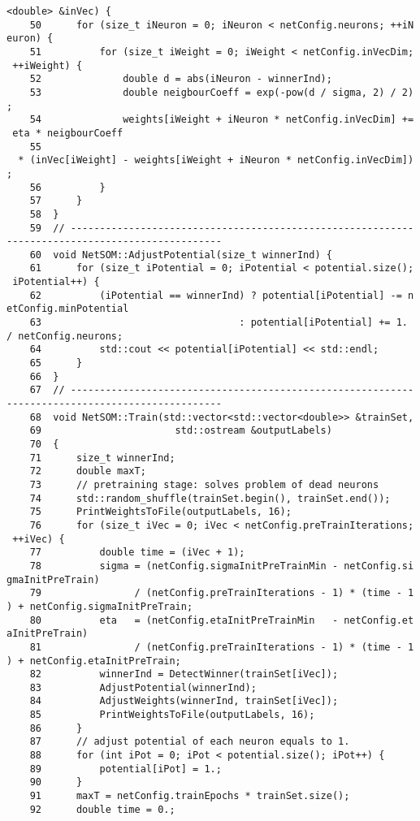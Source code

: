 \begin{verbatim}
<double> &inVec) {
    50      for (size_t iNeuron = 0; iNeuron < netConfig.neurons; ++iN
euron) {
    51          for (size_t iWeight = 0; iWeight < netConfig.inVecDim;
 ++iWeight) {
    52              double d = abs(iNeuron - winnerInd);
    53              double neigbourCoeff = exp(-pow(d / sigma, 2) / 2)
;
    54              weights[iWeight + iNeuron * netConfig.inVecDim] +=
 eta * neigbourCoeff 
    55                                                                
  * (inVec[iWeight] - weights[iWeight + iNeuron * netConfig.inVecDim])
;
    56          }
    57      }
    58  }
    59  // -----------------------------------------------------------
-------------------------------------
    60  void NetSOM::AdjustPotential(size_t winnerInd) {
    61      for (size_t iPotential = 0; iPotential < potential.size();
 iPotential++) {
    62          (iPotential == winnerInd) ? potential[iPotential] -= n
etConfig.minPotential
    63                                  : potential[iPotential] += 1. 
/ netConfig.neurons;
    64          std::cout << potential[iPotential] << std::endl;
    65      }
    66  }
    67  // -----------------------------------------------------------
-------------------------------------
    68  void NetSOM::Train(std::vector<std::vector<double>> &trainSet,
    69                       std::ostream &outputLabels) 
    70  {
    71      size_t winnerInd;
    72      double maxT;
    73      // pretraining stage: solves problem of dead neurons
    74      std::random_shuffle(trainSet.begin(), trainSet.end());
    75      PrintWeightsToFile(outputLabels, 16);
    76      for (size_t iVec = 0; iVec < netConfig.preTrainIterations;
 ++iVec) {
    77          double time = (iVec + 1);        
    78          sigma = (netConfig.sigmaInitPreTrainMin - netConfig.si
gmaInitPreTrain) 
    79                / (netConfig.preTrainIterations - 1) * (time - 1
) + netConfig.sigmaInitPreTrain;
    80          eta   = (netConfig.etaInitPreTrainMin   - netConfig.et
aInitPreTrain)   
    81                / (netConfig.preTrainIterations - 1) * (time - 1
) + netConfig.etaInitPreTrain;
    82          winnerInd = DetectWinner(trainSet[iVec]);
    83          AdjustPotential(winnerInd);
    84          AdjustWeights(winnerInd, trainSet[iVec]);
    85          PrintWeightsToFile(outputLabels, 16);
    86      }
    87      // adjust potential of each neuron equals to 1.
    88      for (int iPot = 0; iPot < potential.size(); iPot++) {
    89          potential[iPot] = 1.;
    90      }
    91      maxT = netConfig.trainEpochs * trainSet.size();
    92      double time = 0.;

\end{verbatim}
